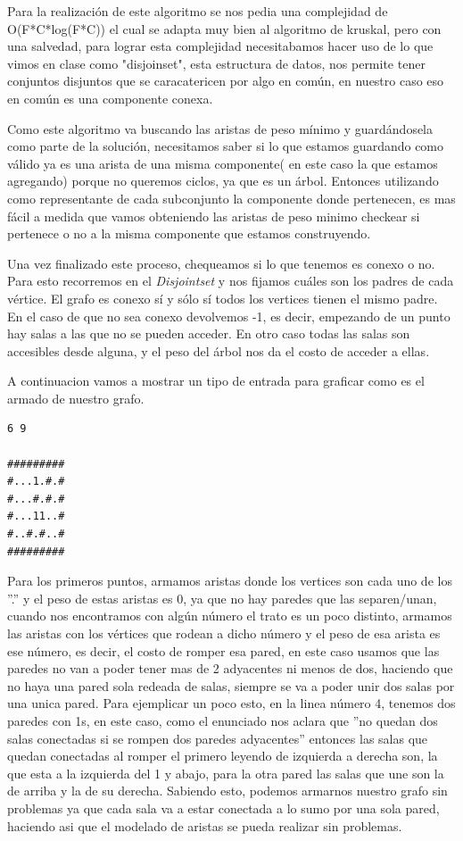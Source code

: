 Para la realización de este algoritmo se nos pedia una complejidad de O(F*C*log(F*C)) el cual se adapta muy bien al algoritmo de kruskal, pero con una 
salvedad, para lograr esta complejidad necesitabamos hacer uso de lo que vimos en clase como "disjoinset", esta estructura de datos, nos permite tener 
conjuntos disjuntos que se caracatericen por algo en común, en nuestro caso eso en común es una componente conexa.

Como este algoritmo va buscando las aristas de peso mínimo y guardándosela como parte de la solución, necesitamos saber si lo que estamos guardando 
como válido ya es una arista de una misma componente( en este caso la que estamos agregando) porque no queremos ciclos, ya que es un árbol. Entonces 
utilizando como representante de cada subconjunto la componente donde pertenecen, es mas fácil a medida que vamos obteniendo las aristas de peso 
minimo checkear si pertenece o no a la misma componente que estamos construyendo.

Una vez finalizado este proceso, chequeamos si lo que tenemos es conexo o no. Para esto recorremos en el  \emph{Disjointset} y nos fijamos cuáles son los padres de cada vértice. El grafo es conexo sí y sólo sí todos los vertices tienen el mismo padre. En el caso de que no sea conexo devolvemos -1, es decir, empezando de un punto hay salas a las que no se pueden acceder. En otro caso todas las salas son accesibles desde alguna, y el peso del árbol nos da el costo de acceder a ellas.


\newpage A continuacion vamos a mostrar un tipo de entrada para graficar como es el armado de nuestro grafo.
\begin{verbatim}
6 9

#########
#...1.#.#
#...#.#.#
#...11..#
#..#.#..#
#########
\end{verbatim}

Para los primeros puntos, armamos aristas donde los vertices son cada uno de los ''.'' y el peso de estas aristas es 0, ya que no hay paredes que las separen/unan, cuando nos encontramos con algún número el trato es un poco distinto, armamos las aristas con los vértices que rodean a dicho número y el peso de esa arista es ese número, es decir, el costo de romper esa pared, en este caso usamos que las paredes no van a poder tener mas de 2 adyacentes ni menos de dos, haciendo que no haya una pared sola redeada de salas, siempre se va a poder unir dos salas por una unica pared. Para ejemplicar un poco esto, en la linea número 4, tenemos dos paredes con 1s, en este caso, como el enunciado nos aclara que ''no quedan dos salas conectadas si se rompen dos paredes adyacentes'' entonces las salas que quedan conectadas al romper el primero leyendo de izquierda a derecha son, la que esta a la izquierda del 1 y abajo, para la otra pared las salas que une son la de arriba y la de su derecha. Sabiendo esto, podemos armarnos nuestro grafo sin problemas ya que cada sala va a estar conectada a lo sumo por una sola pared, haciendo asi que el modelado de aristas se pueda realizar sin problemas. 

